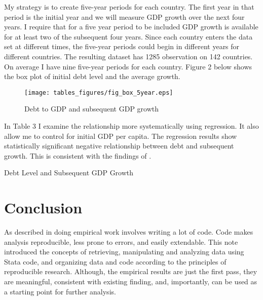 \documentclass[letterpaper,11pt]{article}
\begin{document}
My strategy is to create five-year periods for each country. The first year in that period is the initial year and we will measure GDP growth over the next four years. I require that for a five year period to be included GDP growth is available for at least two of the subsequent four years. Since each country enters the data set at different times, the five-year periods could begin in different years for different countries. The resulting dataset has 1285 observation on 142 countries. On average I have nine five-year periods for each country. Figure 2 below shows the box plot of initial debt level and the average growth.

\begin{figure}[h!]
	\centering
	\texttt{[image: tables\_figures/fig\_box\_5year.eps]}
	\caption{Debt to GDP and subsequent GDP growth}
\end{figure}

In Table 3 I examine the relationship more systematically using regression. It also allow me to control for initial GDP per capita. The regression results show statistically significant negative relationship between debt and subsequent growth. This is consistent with the findings of \cite{eberhardt2015public}. 

\begin{table}[h!] \centering
\caption{Debt Level and Subsequent GDP Growth}
 
\end{table}


\section{Conclusion}

As described in  \cite{gentzkow2014code} doing empirical work involves writing a lot of code. Code makes analysis reproducible, less prone to errors, and easily extendable. This note introduced the concepts of retrieving, manipulating and analyzing data using Stata code, and organizing data and code according to the principles of reproducible research. Although, the empirical results are just the first pass, they are meaningful, consistent with existing finding, and, importantly, can be used as a starting point for further analysis. 



\end{document}
